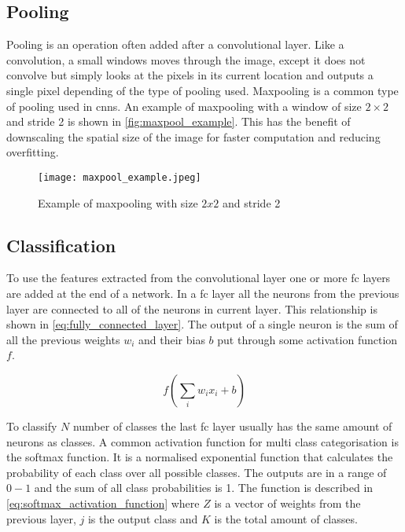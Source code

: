 \subsection{Pooling}
Pooling is an operation often added after a convolutional layer. Like a convolution, a small windows moves through the image, except it does not convolve but simply looks at the pixels in its current location and outputs a single pixel depending of the type of pooling used. Maxpooling is a common type of pooling used in \gls{cnn}s. An example of maxpooling with a window of size $2\times2$ and stride 2  is shown in \autoref{fig:maxpool_example}. This has the benefit of downscaling the spatial size of the image for faster computation and reducing overfitting.

\begin{figure}[H]
\centering
\texttt{[image: maxpool\_example.jpeg]}
\caption{Example of maxpooling with size $2x2$ and stride 2 \citep{Karpathy2016a}}
\label{fig:maxpool_example}
\end{figure}

\subsection{Classification}
To use the features extracted from the convolutional layer one or more \gls{fc} layers are added at the end of a network. In a \gls{fc} layer all the neurons from the previous layer are connected to all of the neurons in current layer. This relationship is shown in \autoref{eq:fully_connected_layer}. The output of a single neuron is the sum of all the previous weights $w_i$ and their bias $b$ put through some activation function $f$.

\begin{equation}
\label{eq:fully_connected_layer}
f\left(\sum_{i}w_{i}x_{i}+b\right)
\end{equation}

To classify $N$ number of classes the last \gls{fc} layer usually has the same amount of neurons as classes. A common activation function for multi class categorisation is the softmax function. It is a normalised exponential function that calculates the probability of each class over all possible classes. The outputs are in a range of $0 - 1$ and the sum of all class probabilities is 1. The function is described in \autoref{eq:softmax_activation_function} where $Z$ is a vector of weights from the previous layer, $j$ is the output class and $K$ is the total amount of classes.

